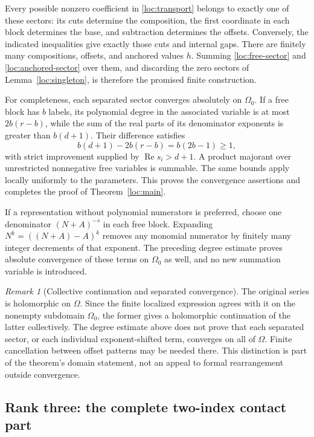 \documentclass[11pt,a4paper]{article}
\numberwithin{equation}{section}
\theoremstyle{definition}
\theoremstyle{remark}
\newtheorem{remark}[theorem]{Remark}
\newcommand{\Rea}{\operatorname{Re}}
\begin{document}
Every possible nonzero coefficient in \eqref{loc:transport} belongs to
exactly one of these sectors: its cuts determine the composition, the
first coordinate in each block determines the base, and subtraction
determines the offsets.  Conversely, the indicated inequalities give
exactly those cuts and internal gaps.  There are finitely many
compositions, offsets, and anchored values $h$.  Summing
\eqref{loc:free-sector} and \eqref{loc:anchored-sector} over them, and
discarding the zero sectors of Lemma~\ref{loc:singleton}, is therefore
the promised finite construction.

For completeness, each separated sector converges absolutely on
$\Omega_0$.  If a free block has $b$ labels, its polynomial degree in
the associated variable is at most $2b(r-b)$, while the sum of the real
parts of its denominator exponents is greater than $b(d+1)$.  Their
difference satisfies
\[
 b(d+1)-2b(r-b)=b(2b-1)\ge1,
\]
with strict improvement supplied by $\Rea s_i>d+1$.  A product
majorant over unrestricted nonnegative free variables is summable.
The same bounds apply locally uniformly to the parameters.  This proves
the convergence assertions and completes the proof of
Theorem~\ref{loc:main}.

If a representation without polynomial numerators is preferred, choose
one denominator $(N+A)^{-s}$ in each free block.  Expanding
$N^k=((N+A)-A)^k$ removes any monomial numerator by finitely many integer
decrements of that exponent.  The preceding degree estimate proves
absolute convergence of these terms on $\Omega_0$ as well, and no new
summation variable is introduced.

\begin{remark}[Collective continuation and separated convergence]
\label{loc:continuation-caution}
The original series is holomorphic on $\Omega$.  Since the finite
localized expression agrees with it on the nonempty subdomain
$\Omega_0$, the former gives a holomorphic continuation of the latter
collectively.  The degree estimate above does not prove that each
separated sector, or each individual exponent-shifted term, converges
on all of $\Omega$.  Finite cancellation between offset patterns may be
needed there.  This distinction is part of the theorem's domain
statement, not an appeal to formal rearrangement outside convergence.
\end{remark}

\subsection{Rank three: the complete two-index contact part}
\end{document}

